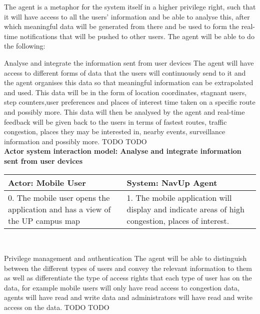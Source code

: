 The agent is a metaphor for the system itself in a higher privilege right, such that it will have access to all the users' information and be able to analyse this, after which meaningful data will be generated from there and be used to form the real-time notifications that will be pushed to other users. The agent will be able to do the following:
\\
\bigskip

\FuncReq
{Analyse and integrate the information sent from user devices}
{The agent will have access to different forms of data that the users will continuously send to it and the agent organises this data so that meaningful information can be extrapolated and used. This data will be in the form of location coordinates, stagnant users, step counters,user preferences and places of interest time taken on a specific route and possibly more. This data will then be analysed by the agent and real-time feedback will be given back to the users in terms of fastest routes, traffic congestion, places they may be interested in, nearby events, surveillance information and possibly more.}
{TODO}
{TODO}
    \\
    \textbf{Actor system interaction model: Analyse and integrate information sent from user devices }\\
    \begin{tabular}{ | p{6cm} | p{6cm} |}
    \hline
    Actor: Mobile User & System: NavUp Agent\\ \hline
     0. The mobile user opens the application and has a view of the UP campus map & 1. The mobile application will display and indicate areas of high congestion, places of interest.\\ \hline
    
    \end{tabular}
\\
\bigskip


\FuncReq
{Privilege management and authentication}
{The agent will be able to distinguish between the different types of users and convey the relevant information to them as well as differentiate the type of access rights that each type of user has on the data, for example mobile users will only have read access to congestion data, agents will have read and write data and administrators will have read and write access on the data.}
{TODO}
{TODO}